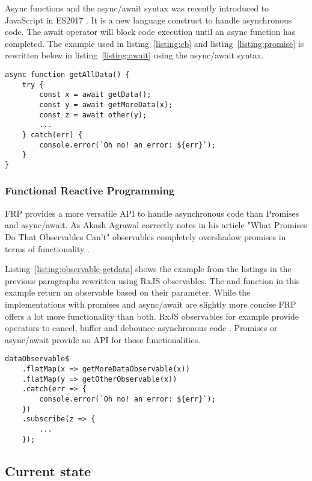 Async functions and the async/await syntax was recently introduced to JavaScript in ES2017 \cite{async-await}. It is a new language construct to handle asynchronous code. The await operator will block code execution until an async function has completed. The example used in listing~\ref{listing:cb} and listing~\ref{listing:promise} is rewritten below in listing~\ref{listing:await} using the async/await syntax. 

\begin{lstlisting}[caption=Fetching data with the async/await keywords,label=listing:await]
async function getAllData() {
	try {
		const x = await getData();
		const y = await getMoreData(x);
		const z = await other(y);
		...
	} catch(err) {
		console.error(`Oh no! an error: ${err}`);
	}
}	
\end{lstlisting}

\subsubsection{Functional Reactive Programming}

FRP provides a more versatile API to handle asynchronous code than Promises and async/await. As Akash Agrawal correctly notes in his article "What Promises Do That Observables Can’t" observables completely overshadow promises in terms of functionality \cite{observables-promises}.

Listing~\ref{listing:observable-getdata} shows the example from the listings in the previous paragraphs rewritten using RxJS observables. The  and  function in this example return an observable based on their parameter. While the implementations with promises and async/await are slightly more concise FRP offers a lot more functionality than both. RxJS observables for example provide operators to cancel, buffer and debounce asynchronous code \cite{rxjs-ben}. Promises or async/await provide no API for those functionalities.

\begin{lstlisting}[caption=Fetching data with FRP (RxJS),label=listing:observable-getdata]
dataObservable$
	.flatMap(x => getMoreDataObservable(x))
	.flatMap(y => getOtherObservable(x))
	.catch(err => {
		console.error(`Oh no! an error: ${err}`);
	})
	.subscribe(z => {
		...
	});
\end{lstlisting}

\subsection{Current state}

